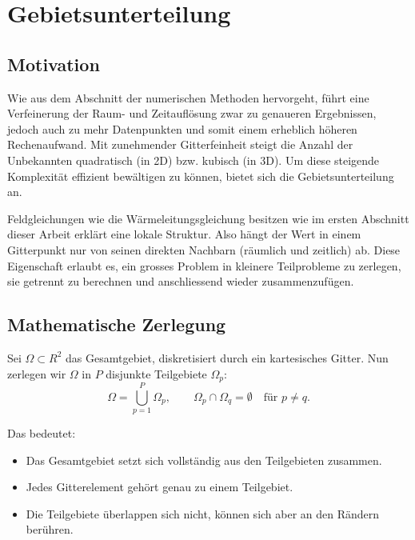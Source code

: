 %
%
\section{Gebietsunterteilung}
\label{parallelisierung:sec:Gebietsunterteilung}


\subsection{Motivation}
Wie aus dem Abschnitt der numerischen Methoden hervorgeht, führt eine Verfeinerung der Raum- und Zeitauflösung zwar zu genaueren Ergebnissen, jedoch auch zu mehr Datenpunkten und somit einem erheblich höheren Rechenaufwand. 
Mit zunehmender Gitterfeinheit steigt die Anzahl der Unbekannten quadratisch (in 2D) bzw. kubisch (in 3D).  
Um diese steigende Komplexität effizient bewältigen zu können, bietet sich die Gebietsunterteilung an.

Feldgleichungen wie die Wärmeleitungsgleichung besitzen wie im ersten Abschnitt dieser Arbeit erklärt eine lokale Struktur.
Also hängt der Wert in einem Gitterpunkt nur von seinen direkten Nachbarn (räumlich und zeitlich) ab.  
Diese Eigenschaft erlaubt es, ein grosses Problem in kleinere Teilprobleme zu zerlegen, sie getrennt zu berechnen und anschliessend wieder zusammenzufügen.

\subsection{Mathematische Zerlegung}
Sei $\Omega \subset {R}^2$ das Gesamtgebiet, diskretisiert durch ein kartesisches Gitter.  
Nun zerlegen wir $\Omega$ in $P$ disjunkte Teilgebiete $\Omega_p$:
\begin{equation}
	\Omega = \bigcup_{p=1}^P \Omega_p,
	\qquad 
	\Omega_p \cap \Omega_q = \emptyset \quad \text{für } p \neq q.
\end{equation}

Das bedeutet:
\begin{itemize}
	\item Das Gesamtgebiet setzt sich vollständig aus den Teilgebieten zusammen.
	\item Jedes Gitterelement gehört genau zu einem Teilgebiet.
	\item Die Teilgebiete überlappen sich nicht, können sich aber an den Rändern berühren.
\end{itemize}

